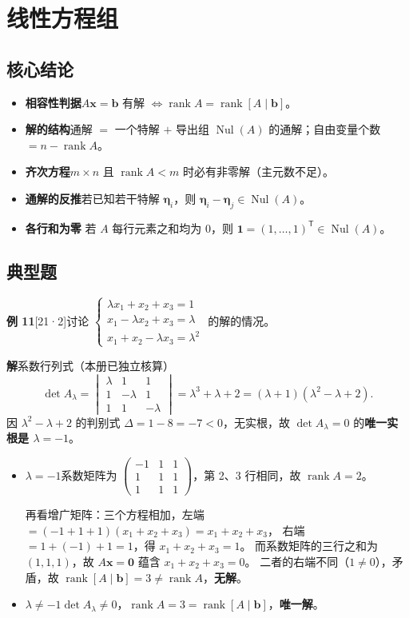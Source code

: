 \documentclass[10pt]{ctexart}
\newcommand{\rank}{\operatorname{rank}}
\newcommand{\Nul}{\operatorname{Nul}}
\newcommand{\TT}{^{\mathsf T}}
\newcommand{\bv}[1]{\begin{pmatrix}#1\end{pmatrix}}
\newcommand{\y}[1]{\textcolor{y21}{[21·#1]}}
\begin{document}
\section{线性方程组}

\subsection{核心结论}

\begin{itemize}
\item \textbf{相容性判据}\quad $A\mathbf x=\mathbf b$ 有解 $\iff\rank A=\rank[A\mid\mathbf b]$。
\item \textbf{解的结构}\quad 通解 $=$ 一个特解 $+$ 导出组 $\Nul(A)$ 的通解；自由变量个数 $=n-\rank A$。
\item \textbf{齐次方程}\quad $m\times n$ 且 $\rank A<m$ 时必有非零解（主元数不足）。
\item \textbf{通解的反推}\quad 若已知若干特解 $\boldsymbol\eta_i$，则 $\boldsymbol\eta_i-\boldsymbol\eta_j\in\Nul(A)$。
\item \textbf{各行和为零} \quad 若 $A$ 每行元素之和均为 $0$，则 $\mathbf 1=(1,\dots,1)\TT\in\Nul(A)$。
\end{itemize}

\subsection{典型题}

\textbf{例 11}\y{2}\quad 讨论
$\begin{cases}\lambda x_1+x_2+x_3=1\\ x_1-\lambda x_2+x_3=\lambda\\ x_1+x_2-\lambda x_3=\lambda^2\end{cases}$ 的解的情况。

\textbf{解}\quad 系数行列式（本册已独立核算）
\[
\det A_\lambda=\begin{vmatrix}\lambda&1&1\\1&-\lambda&1\\1&1&-\lambda\end{vmatrix}
=\lambda^3+\lambda+2=(\lambda+1)(\lambda^2-\lambda+2).
\]
因 $\lambda^2-\lambda+2$ 的判别式 $\Delta=1-8=-7<0$，无实根，故 $\det A_\lambda=0$ 的\textbf{唯一实根是 $\lambda=-1$}。

\begin{itemize}
\item \textbf{$\lambda=-1$}\quad 系数矩阵为 $\bv{-1&1&1\\1&1&1\\1&1&1}$，第 2、3 行相同，故 $\rank A=2$。

再看增广矩阵：三个方程相加，左端 $=(-1+1+1)(x_1+x_2+x_3)=x_1+x_2+x_3$，
右端 $=1+(-1)+1=1$，得 $x_1+x_2+x_3=1$。
而系数矩阵的三行之和为 $(1,1,1)$，故 $A\mathbf x=\mathbf 0$ 蕴含 $x_1+x_2+x_3=0$。
二者的右端不同（$1\ne0$），矛盾，故 $\rank[A\mid\mathbf b]=3\neq\rank A$，\textbf{无解}。
\item \textbf{$\lambda\ne-1$}\quad $\det A_\lambda\ne0$，$\rank A=3=\rank[A\mid\mathbf b]$，\textbf{唯一解}。
\end{itemize}
\end{document}
